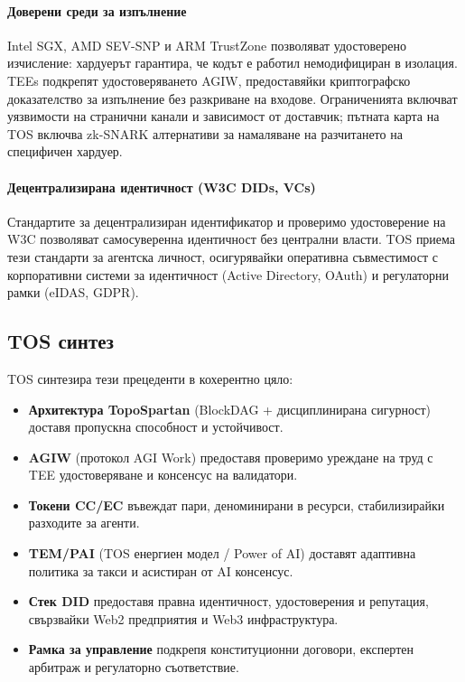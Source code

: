 \documentclass[11pt]{article}
\begin{document}
\paragraph{Доверени среди за изпълнение} Intel SGX, AMD SEV-SNP и ARM TrustZone позволяват удостоверено изчисление: хардуерът гарантира, че кодът е работил немодифициран в изолация. TEEs подкрепят удостоверяването AGIW, предоставяйки криптографско доказателство за изпълнение без разкриване на входове. Ограниченията включват уязвимости на странични канали и зависимост от доставчик; пътната карта на TOS включва zk-SNARK алтернативи за намаляване на разчитането на специфичен хардуер.

\paragraph{Децентрализирана идентичност (W3C DIDs, VCs)} Стандартите за децентрализиран идентификатор и проверимо удостоверение на W3C позволяват самосуверенна идентичност без централни власти. TOS приема тези стандарти за агентска личност, осигурявайки оперативна съвместимост с корпоративни системи за идентичност (Active Directory, OAuth) и регулаторни рамки (eIDAS, GDPR).

\subsection{TOS синтез}
TOS синтезира тези прецеденти в кохерентно цяло:
\begin{itemize}[noitemsep]
  \item \textbf{Архитектура TopoSpartan} (BlockDAG + дисциплинирана сигурност) доставя пропускна способност и устойчивост.
  \item \textbf{AGIW} (протокол AGI Work) предоставя проверимо уреждане на труд с TEE удостоверяване и консенсус на валидатори.
  \item \textbf{Токени CC/EC} въвеждат пари, деноминирани в ресурси, стабилизирайки разходите за агенти.
  \item \textbf{TEM/PAI} (TOS енергиен модел / Power of AI) доставят адаптивна политика за такси и асистиран от AI консенсус.
  \item \textbf{Стек DID} предоставя правна идентичност, удостоверения и репутация, свързвайки Web2 предприятия и Web3 инфраструктура.
  \item \textbf{Рамка за управление} подкрепя конституционни договори, експертен арбитраж и регулаторно съответствие.
\end{itemize}
\end{document}

